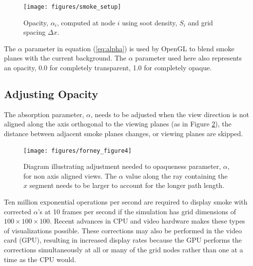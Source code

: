 \begin{figure}[\figoptions]
\begin{center}
\texttt{[image: figures/smoke\_setup]}
\end{center}
\caption {Opacity, $\alpha_i$, computed at node $i$ using soot density, $S_i$ and grid spacing $\Delta x$.}
\label{figsmokesetup}
\end{figure}


The $\alpha$ parameter in equation (\ref{eq:alpha}) is used by
OpenGL to blend smoke planes with the current background.  The
$\alpha$ parameter used here also represents an opacity, 0.0 for
completely transparent, 1.0 for completely opaque.

%
%

\subsection{Adjusting Opacity}

The absorption parameter, $\alpha$, needs to be adjusted when the
view direction is not aligned along the axis orthogonal to the
viewing planes (as in Figure \ref{figray}), the distance between
adjacent smoke planes changes, or viewing planes are skipped.
\begin{figure}[\figoptions]
\centerline{\texttt{[image: figures/forney\_figure4]}}
\caption [Diagram illustrating the adjustment needed to opaqueness
parameter, $\alpha$, for non axis aligned views.] { Diagram
illustrating adjustment needed to opaqueness parameter, $\alpha$,
for non axis aligned views. The $\alpha$ value along the ray
containing the $\hat{x}$ segment needs to be larger to account for
the longer path length. } \label{figray}
\end{figure}

Ten million exponential operations per second are required to
display smoke with corrected $\alpha$'s at 10 frames per second if
the simulation has grid dimensions of $100\times 100\times 100$.
Recent advances in CPU and video hardware makes these types of
visualizations possible. These corrections may also be performed
in the video card (GPU), resulting in increased display rates
because the GPU performs the corrections simultaneously at all or
many of the grid nodes rather than one at a time as the CPU would.

